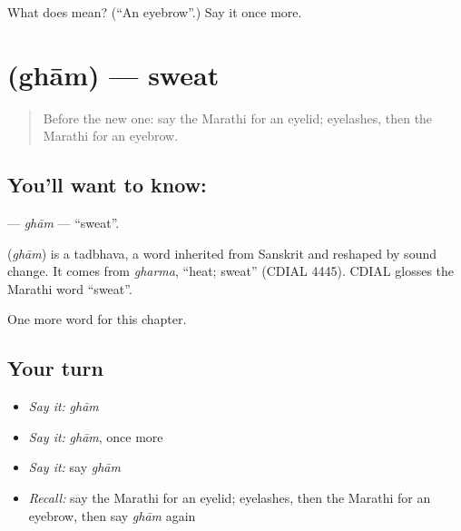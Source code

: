 \begin{tcolorbox}[breakable,colback=teal!4,colframe=teal!35!black,title={Before you move on}]
What does  mean? (\textquotedblleft{}An eyebrow\textquotedblright{}.) Say it once more.
\end{tcolorbox}
\section[\texorpdfstring{\mr{घाम} (ghām)}{घाम (ghām)}]{ (ghām) — sweat}

\label{lesson:MR-C220-gham}



\begin{quote}
Before the new one: say the Marathi for an eyelid; eyelashes, then the Marathi for an eyebrow.
\end{quote}

\subsection*{You'll want to know: }
\textbf{} — \emph{ghām} — \textquotedblleft{}sweat\textquotedblright{}.

\begin{cousinweb}
\textbf{} (\emph{ghām}) is a tadbhava, a word inherited from Sanskrit and reshaped by sound change. It comes from \emph{gharma}, \textquotedblleft{}heat; sweat\textquotedblright{} (CDIAL 4445). CDIAL glosses the Marathi word \textquotedblleft{}sweat\textquotedblright{}.
\end{cousinweb}

\begin{grammarlens}[title={What you've built}]
One more word for this chapter.
\end{grammarlens}

\subsection*{Your turn}
\begin{itemize}
\raggedright
  \item \emph{Say it:} \emph{ghām}
  \item \emph{Say it:} \emph{ghām}, once more
  \item \emph{Say it:} say \emph{ghām}
  \item \emph{Recall:} say the Marathi for an eyelid; eyelashes, then the Marathi for an eyebrow, then say \emph{ghām} again
\end{itemize}

